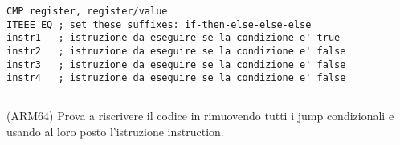 \begin{lstlisting}[caption=ARM (\ThumbMode),style=customasmARM]
CMP register, register/value
ITEEE EQ ; set these suffixes: if-then-else-else-else
instr1   ; istruzione da eseguire se la condizione e' true
instr2   ; istruzione da eseguire se la condizione e' false
instr3   ; istruzione da eseguire se la condizione e' false
instr4   ; istruzione da eseguire se la condizione e' false
\end{lstlisting}

\subsection{\Exercise}

(ARM64) Prova a riscrivere il codice in  rimuovendo tutti i jump condizionali e usando al loro posto l'istruzione  instruction.
